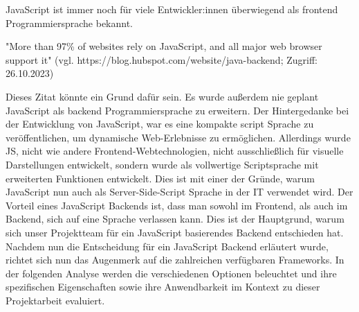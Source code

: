JavaScript ist immer noch für viele Entwickler:innen überwiegend als frontend Programmiersprache bekannt. 

"More than 97\% of websites rely on JavaScript, and all major web browser support it"
(vgl. https://blog.hubspot.com/website/java-backend; Zugriff: 26.10.2023)

Dieses Zitat könnte ein Grund dafür sein. Es wurde außerdem nie geplant JavaScript als backend Programmiersprache zu erweitern. Der Hintergedanke bei der Entwicklung von JavaScript, war es eine kompakte script Sprache zu veröffentlichen, um dynamische Web-Erlebnisse zu ermöglichen. Allerdings wurde JS, nicht wie andere Frontend-Webtechnologien, nicht ausschließlich für visuelle Darstellungen entwickelt, sondern wurde als vollwertige Scriptsprache mit erweiterten Funktionen entwickelt. Dies ist mit einer der Gründe, warum JavaScript nun auch als Server-Side-Script Sprache in der IT verwendet wird.
\newline
Der Vorteil eines JavaScript Backends ist, dass man sowohl im Frontend, als auch im Backend, sich auf eine Sprache verlassen kann. Dies ist der Hauptgrund, warum sich unser Projektteam für ein JavaScript basierendes Backend entschieden hat.
\newline
Nachdem nun die Entscheidung für ein JavaScript Backend erläutert wurde, richtet sich nun das Augenmerk auf die zahlreichen verfügbaren Frameworks. In der folgenden Analyse werden die verschiedenen Optionen beleuchtet und ihre spezifischen Eigenschaften sowie ihre Anwendbarkeit im Kontext zu dieser Projektarbeit evaluiert.
\cite{Backend_JavaScript}